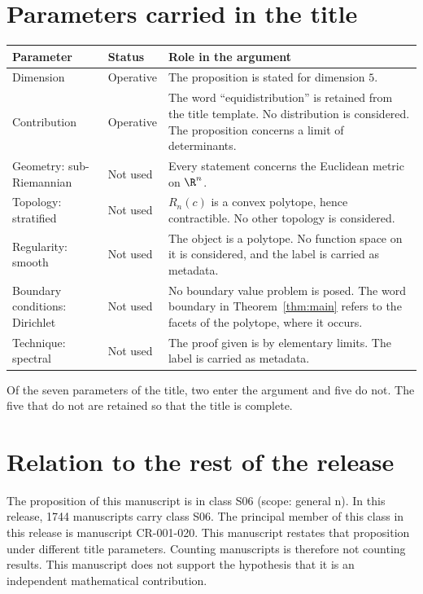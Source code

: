 \documentclass[11pt]{article}
\begin{document}
\section{Parameters carried in the title}\label{sec:params}
\begin{center}
\small
\begin{tabular}{p{}p{}p{}}
\toprule
Parameter & Status & Role in the argument \\
\midrule
Dimension & Operative & The proposition is stated for dimension $5$. \\
Contribution & Operative & The word ``equidistribution'' is retained from the title template. No distribution is considered. The proposition concerns a limit of determinants. \\
Geometry: sub-Riemannian & Not used & Every statement concerns the Euclidean metric on $\R^n$. \\
Topology: stratified & Not used & $R_n(c)$ is a convex polytope, hence contractible. No other topology is considered. \\
Regularity: smooth & Not used & The object is a polytope. No function space on it is considered, and the label is carried as metadata. \\
Boundary conditions: Dirichlet & Not used & No boundary value problem is posed. The word boundary in Theorem~\ref{thm:main} refers to the facets of the polytope, where it occurs. \\
Technique: spectral & Not used & The proof given is by elementary limits. The label is carried as metadata. \\
\bottomrule
\end{tabular}
\end{center}
Of the seven parameters of the title, two enter the argument and five do not. The five that do not are retained so that the title is complete.

\section{Relation to the rest of the release}
The proposition of this manuscript is in class S06 (scope: general n).
In this release, 1744 manuscripts carry class S06. The principal member of this class in this release is manuscript CR-001-020. This manuscript restates that proposition under different title parameters.
Counting manuscripts is therefore not counting results. This manuscript does not support the hypothesis that it is an independent mathematical contribution.
\end{document}
